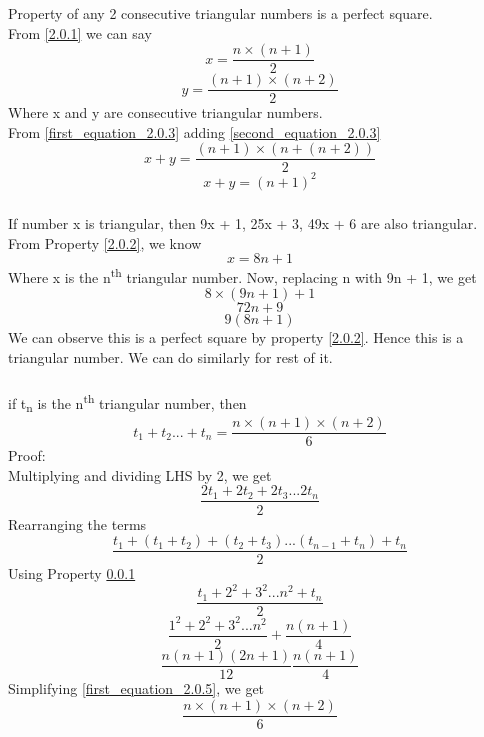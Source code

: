 \documentclass{article}
\begin{document}
\subsubsection{}\label{2.0.3}
Property of any 2 consecutive triangular numbers is a perfect square. \\


From \ref{2.0.1} we can say
\begin{equation}\label{first_equation_2.0.3}
    x = \frac{n \times (n+1)}{2}
\end{equation}
\begin{equation}\label{second_equation_2.0.3}
    y = \frac{(n+1) \times (n+2) }{2}
\end{equation}
Where x and y are consecutive triangular numbers. \\

From \ref{first_equation_2.0.3} adding \ref{second_equation_2.0.3} \\
\[ x + y = \frac{ (n+1) \times ( n + (n + 2) )}{2}\]
\[ x + y = (n+1)^2 \]

\subsubsection{}\label{2.0.4}
If number x is triangular, then 9x + 1, 25x + 3, 49x + 6 are also triangular.\\

From Property \ref{2.0.2}, we know
\[ x = 8n + 1 \]
Where x is the n\textsuperscript{th} triangular number. 
Now, replacing n with 9n + 1, we get
\[ 8\times(9n+1) + 1\]
\[ 72n + 9 \]
\[ 9(8n + 1)\]
We can observe this is a perfect square by property \ref{2.0.2}. Hence this is a triangular number. We can do similarly for rest of it.
\newpage
\subsubsection{}\label{2.0.5}
if t\textsubscript{n} is the n\textsuperscript{th} triangular number, then
\[ t_1 + t_2 . . . +t_n = \frac{n\times(n+1)\times(n+2)}{6}\]
Proof: \\
Multiplying and dividing LHS by 2, we get
\[\frac{2t_1 + 2t_2 + 2t_3 . . . 2t_n}{2}\]
Rearranging the terms
\[\frac{t_1 + (t_1 + t_2 ) + (t_2 + t_3) . . . (t_{n-1} + t_n ) + t_n}{2} \]
Using Property \ref{2.0.3}
\[\frac{ t_1 + 2^2 + 3^2 . . . n^2 + t_n}{2} \]
\[\frac{1^2 + 2^2 + 3^2 . . . n^2}{2} + \frac{n(n+1)}{4} \]
\begin{equation}\label{first_equation_2.0.5}
  \frac{n(n+1)(2n+1)}{12}  \frac{n(n+1)}{4}  
\end{equation}
Simplifying \ref{first_equation_2.0.5}, we get
\[\frac{n\times(n+1)\times(n+2)}{6}\]
\end{document}
